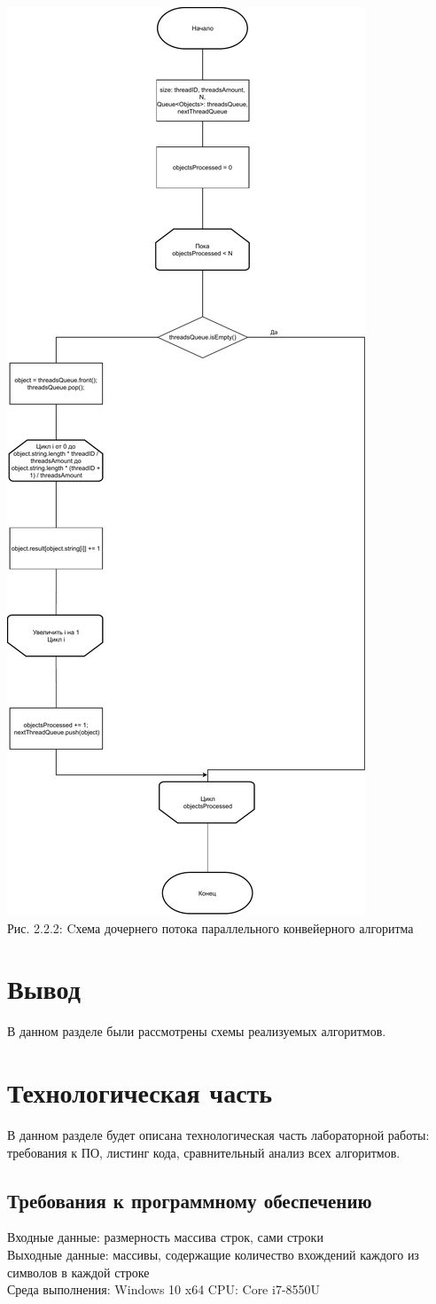 \documentclass[12pt,a4paper]{article}
\numberwithin{equation}{section}
\begin{document}
\begin{center}	
	\includegraphics[width=.5\linewidth]{src/schemas/parallel_thread}\\
	Рис. 2.2.2: Cхема дочернего потока параллельного конвейерного алгоритма
\end{center}
\clearpage
{}
\section*{Вывод}
\qquad В данном разделе были рассмотрены схемы реализуемых алгоритмов.
\clearpage

\section{Технологическая часть}
\qquad В данном разделе будет описана технологическая часть лабораторной работы: требования к ПО, листинг кода, сравнительный анализ всех алгоритмов.
\subsection{Требования к программному обеспечению}
\qquad Входные данные: размерность массива строк, сами строки\\
\qquad Выходные данные: массивы, содержащие количество вхождений каждого из символов в каждой строке\\
\qquad Среда выполнения: Windows 10 x64
\qquad CPU:  Core i7-8550U
\end{document}
